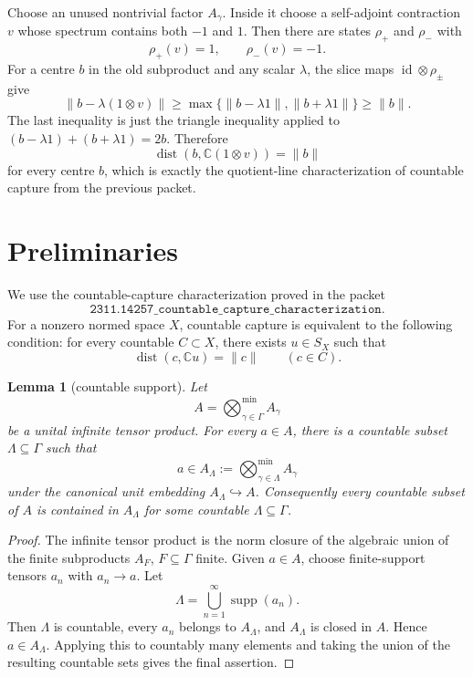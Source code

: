\documentclass[11pt]{article}
\newtheorem{lemma}{Lemma}
\newcommand{\C}{\mathbb C}
\newcommand{\dist}{\operatorname{dist}}
\begin{document}
Choose an unused nontrivial factor \(A_\gamma\).  Inside it choose a
self-adjoint contraction \(v\) whose spectrum contains both \(-1\) and \(1\).
Then there are states \(\rho_+\) and \(\rho_-\) with
\[
        \rho_+(v)=1,\qquad \rho_-(v)=-1.
\]
For a centre \(b\) in the old subproduct and any scalar \(\lambda\), the
slice maps \(\operatorname{id}\otimes\rho_\pm\) give
\[
        \|b-\lambda(1\otimes v)\|
        \ge
        \max\{\|b-\lambda 1\|,\|b+\lambda 1\|\}
        \ge
        \|b\|.
\]
The last inequality is just the triangle inequality applied to
\((b-\lambda1)+(b+\lambda1)=2b\).  Therefore
\[
        \dist(b,\C(1\otimes v))=\|b\|
\]
for every centre \(b\), which is exactly the quotient-line characterization
of countable capture from the previous packet.

\section*{Preliminaries}

We use the countable-capture characterization proved in the packet
\[
\texttt{2311.14257\_countable\_capture\_characterization}.
\]
For a nonzero normed space \(X\), countable capture is equivalent to the
following condition: for every countable \(C\subset X\), there exists
\(u\in S_X\) such that
\[
        \dist(c,\C u)=\|c\|
        \qquad(c\in C).
\]

\begin{lemma}[countable support]
\label{lem:support}
Let
\[
        A=\bigotimes_{\gamma\in\Gamma}^{\min} A_\gamma
\]
be a unital infinite tensor product.  For every \(a\in A\), there is a
countable subset \(\Lambda\subseteq\Gamma\) such that
\[
        a\in A_\Lambda
        :=
        \bigotimes_{\gamma\in\Lambda}^{\min} A_\gamma
\]
under the canonical unit embedding \(A_\Lambda\hookrightarrow A\).
Consequently every countable subset of \(A\) is contained in \(A_\Lambda\)
for some countable \(\Lambda\subseteq\Gamma\).
\end{lemma}

\begin{proof}
The infinite tensor product is the norm closure of the algebraic union of the
finite subproducts \(A_F\), \(F\subseteq\Gamma\) finite.  Given \(a\in A\),
choose finite-support tensors \(a_n\) with \(a_n\to a\).  Let
\[
        \Lambda=\bigcup_{n=1}^\infty \operatorname{supp}(a_n).
\]
Then \(\Lambda\) is countable, every \(a_n\) belongs to \(A_\Lambda\), and
\(A_\Lambda\) is closed in \(A\).  Hence \(a\in A_\Lambda\).  Applying this
to countably many elements and taking the union of the resulting countable
sets gives the final assertion.
\end{proof}
\end{document}
